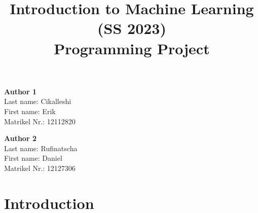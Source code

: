 \documentclass[a4, 10 pt, conference]{ieeeconf}  %
\title{\LARGE \bf
Introduction to Machine Learning (SS 2023)\\ Programming Project
\vspace{-3em}
}
\begin{document}
\maketitle
\vspace{-3em}
\thispagestyle{empty}
\pagestyle{empty}

\begin{strip}
  \begin{tcolorbox}[
      size=tight,
      colback=white,
      boxrule=0.2mm,
      left=3mm,right=3mm, top=3mm, bottom=1mm
    ]
    {\begin{multicols}{3}%

        \textbf{Author 1}       \\
        Last name: Cikalleshi             \\  %
        First name: Erik            \\  %
        Matrikel Nr.: 12112820              \\  %

        \columnbreak

        \textbf{Author 2}       \\
        Last name: Rufinatscha            \\  %
        First name: Daniel            \\  %
        Matrikel Nr.: 12127306           \\  %

        \columnbreak


      \end{multicols}}
  \end{tcolorbox}
\end{strip}


\section{Introduction}
\label{sec:intro}
\end{document}
